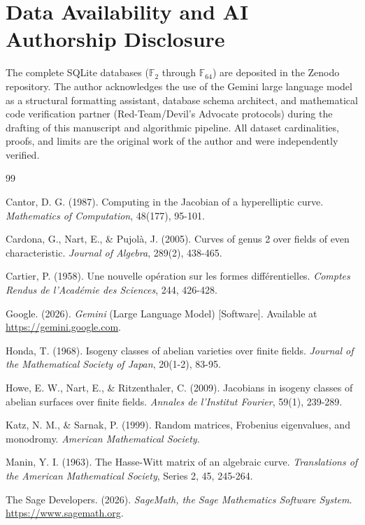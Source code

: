 \documentclass[letterpaper, 11pt]{article}
\begin{document}
	\section{Data Availability and AI Authorship Disclosure}
	The complete SQLite databases ($\mathbb{F}_{2}$ through $\mathbb{F}_{64}$) are deposited in the Zenodo repository. The author acknowledges the use of the Gemini large language model \cite{Gemini2026} as a structural formatting assistant, database schema architect, and mathematical code verification partner (Red-Team/Devil's Advocate protocols) during the drafting of this manuscript and algorithmic pipeline. All dataset cardinalities, proofs, and limits are the original work of the author and were independently verified.
	
	\begin{thebibliography}{99}
		
		Cantor, D. G. (1987). Computing in the Jacobian of a hyperelliptic curve. \textit{Mathematics of Computation}, 48(177), 95-101.
		
		Cardona, G., Nart, E., \& Pujolà, J. (2005). Curves of genus 2 over fields of even characteristic. \textit{Journal of Algebra}, 289(2), 438-465.
		
		Cartier, P. (1958). Une nouvelle op\'{e}ration sur les formes diff\'{e}rentielles. \textit{Comptes Rendus de l'Acad\'{e}mie des Sciences}, 244, 426-428.
		
		Google. (2026). \textit{Gemini} (Large Language Model) [Software]. Available at \url{https://gemini.google.com}.
		
		Honda, T. (1968). Isogeny classes of abelian varieties over finite fields. \textit{Journal of the Mathematical Society of Japan}, 20(1-2), 83-95.
		
		Howe, E. W., Nart, E., \& Ritzenthaler, C. (2009). Jacobians in isogeny classes of abelian surfaces over finite fields. \textit{Annales de l'Institut Fourier}, 59(1), 239-289.
		
		Katz, N. M., \& Sarnak, P. (1999). Random matrices, Frobenius eigenvalues, and monodromy. \textit{American Mathematical Society}.
		
		Manin, Y. I. (1963). The Hasse-Witt matrix of an algebraic curve. \textit{Translations of the American Mathematical Society}, Series 2, 45, 245-264.
		
		The Sage Developers. (2026). \textit{SageMath, the Sage Mathematics Software System}. \url{https://www.sagemath.org}.
		

\end{thebibliography}
\end{document}

